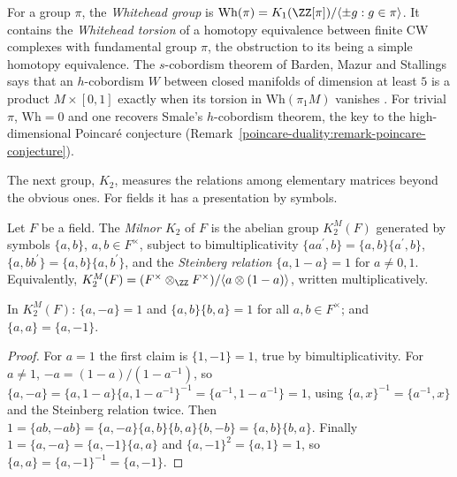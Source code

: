 \begin{remark}\label{k-theory:remark-whitehead-group}
For a group $\pi$, the \emph{Whitehead group} is $\mathrm{Wh}(\pi) = K_1(\ZZ[\pi])/\langle\pm g : g \in \pi\rangle$. It contains the \emph{Whitehead torsion} of a homotopy equivalence between finite CW complexes with
fundamental group $\pi$, the obstruction to its being a simple homotopy equivalence. The $s$-cobordism theorem of Barden, Mazur and Stallings says that an $h$-cobordism $W$ between closed manifolds of
dimension at least $5$ is a product $M \times [0, 1]$ exactly when its torsion in $\mathrm{Wh}(\pi_1M)$ vanishes \cite{milnor-1966}. For trivial $\pi$, $\mathrm{Wh} = 0$ and one recovers Smale's $h$-cobordism theorem, the key to the
high-dimensional Poincar\'e conjecture (Remark~\ref{poincare-duality:remark-poincare-conjecture}).
\end{remark}

The next group, $K_2$, measures the relations among elementary matrices beyond the obvious ones. For fields it has a presentation by symbols.

\begin{definition}\label{k-theory:definition-milnor-k-two}
Let $F$ be a field. The \emph{Milnor $K_2$} of $F$ is the abelian group $K_2^M(F)$ generated by symbols $\{a, b\}$, $a, b \in F^\times$, subject to bimultiplicativity
$\{aa^{\prime}, b\} = \{a, b\}\{a^{\prime}, b\}$, $\{a, bb^{\prime}\} = \{a, b\}\{a, b^{\prime}\}$, and the \emph{Steinberg relation} $\{a, 1 - a\} = 1$ for $a \neq 0, 1$. Equivalently,
$K_2^M(F) = (F^\times \otimes_\ZZ F^\times)/\langle a \otimes (1 - a)\rangle$, written multiplicatively.
\end{definition}

\begin{proposition}\label{k-theory:proposition-symbols}
In $K_2^M(F)$: $\{a, -a\} = 1$ and $\{a, b\}\{b, a\} = 1$ for all $a, b \in F^\times$; and $\{a, a\} = \{a, -1\}$.
\end{proposition}

\begin{proof}
For $a = 1$ the first claim is $\{1, -1\} = 1$, true by bimultiplicativity. For $a \neq 1$, $-a = (1 - a)/(1 - a^{-1})$, so $\{a, -a\} = \{a, 1 - a\}\{a, 1 - a^{-1}\}^{-1} = \{a^{-1}, 1 - a^{-1}\} = 1$,
using $\{a, x\}^{-1} = \{a^{-1}, x\}$ and the Steinberg relation twice. Then $1 = \{ab, -ab\} = \{a, -a\}\{a, b\}\{b, a\}\{b, -b\} = \{a, b\}\{b, a\}$. Finally $1 = \{a, -a\} = \{a, -1\}\{a, a\}$ and
$\{a, -1\}^2 = \{a, 1\} = 1$, so $\{a, a\} = \{a, -1\}^{-1} = \{a, -1\}$.
\end{proof}

